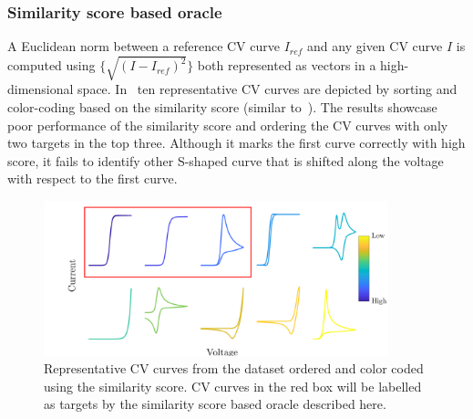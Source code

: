 \subsubsection{Similarity score based oracle}
A Euclidean norm between a reference CV curve \(I_{ref}\) and any given CV curve \(I\) is computed using \(\{\sqrt{(I - I_{ref})^2}\}\) both represented as vectors in a high-dimensional space. 
In~ ten representative CV curves are depicted by sorting and color-coding based on the similarity score (similar to~). 
The results showcase poor performance of the similarity score and ordering the CV curves with only two targets in the top three.
Although it marks the first curve correctly with high score, it fails to identify other S-shaped curve that is shifted along the voltage with respect to the first curve.
\begin{figure}[h]
    \centering
    \includegraphics[width=100mm]{Chapter-3/figures/repsimscorespectrum.png}
    \caption{Representative CV curves from the dataset ordered and color coded using the similarity score. CV curves in the red box will be labelled as targets by the similarity score based oracle described here.}
    \label{figSI:repssscores}
\end{figure}


